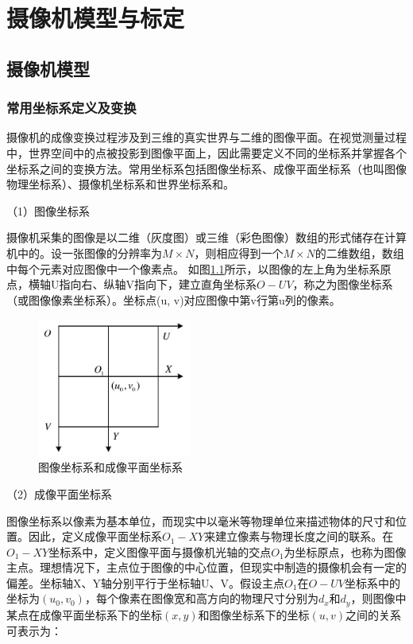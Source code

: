 
\chapter{摄像机模型与标定}
\section{摄像机模型}
\subsection{常用坐标系定义及变换}
摄像机的成像变换过程涉及到三维的真实世界与二维的图像平面。在视觉测量过程中，世界空间中的点被投影到图像平面上，因此需要定义不同的坐标系并掌握各个坐标系之间的变换方法。常用坐标系包括图像坐标系、成像平面坐标系（也叫图像物理坐标系）、摄像机坐标系和世界坐标系和。

（1）图像坐标系

摄像机采集的图像是以二维（灰度图）或三维（彩色图像）数组的形式储存在计算机中的。设一张图像的分辨率为$M\times N$，则相应得到一个$M\times N$的二维数组，数组中每个元素对应图像中一个像素点。 如图\ref{fig:2_1_image_coord}所示，以图像的左上角为坐标系原点，横轴U指向右、纵轴V指向下，建立直角坐标系$O-UV$，称之为图像坐标系（或图像像素坐标系）。坐标点(u, v)对应图像中第v行第u列的像素。

\begin{figure}[!htb] %
	\centering
	\includegraphics[width=2in]{figures/2_1_image_coord}
	\caption{图像坐标系和成像平面坐标系}\label{fig:2_1_image_coord}
\end{figure}

（2）成像平面坐标系

图像坐标系以像素为基本单位，而现实中以毫米等物理单位来描述物体的尺寸和位置。因此，定义成像平面坐标系$O_1-XY$来建立像素与物理长度之间的联系。在$O_1-XY$坐标系中，定义图像平面与摄像机光轴的交点$O_1$为坐标原点，也称为图像主点。理想情况下，主点位于图像的中心位置，但现实中制造的摄像机会有一定的偏差。坐标轴X、Y轴分别平行于坐标轴U、V。假设主点$O_1$在$O-UV$坐标系中的坐标为$(u_0, v_0)$，每个像素在图像宽和高方向的物理尺寸分别为$d_x$和$d_y$，则图像中某点在成像平面坐标系下的坐标$(x, y)$和图像坐标系下的坐标$(u,v )$之间的关系可表示为：

